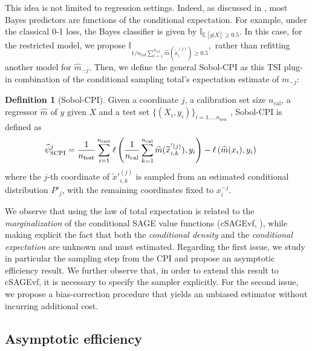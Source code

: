 \documentclass{article}
\theoremstyle{plain}
\theoremstyle{definition}
\newtheorem{definition}[theorem]{Definition}
\theoremstyle{remark}
\begin{document}
This idea is not limited to regression settings. Indeed, as discussed in \citet{williamson2023general}, most Bayes predictors are functions of the conditional expectation. 
%
For example, under the classical 0-1 loss, the Bayes classifier is given by $\mathbb{I}_{\mathbb{E}[y|X] \geq 0.5}$. 
%
In this case, for the restricted model, we propose
$
\mathbb{I}_{1/n_\mathrm{cal} \sum_{i=1}^{n_\mathrm{cal}} \widehat{m}\left( \widetilde{x}^{(j)}_i \right) \geq 0.5},
$
rather than refitting another model for $\widehat{m}_{-j}$.
%
Then, we define the general Sobol-CPI as this TSI plug-in combination of the conditional sampling total's expectation estimate of $m_{-j}$:
%
\begin{definition}[Sobol-CPI] Given a coordinate $j$, a calibration set size $n_\mathrm{cal}$, a regressor $\widehat{m}$ of $y$ given $X$ and a test set $\{(X_i, y_i)\}_{i=1,\ldots n_\mathrm{test}}$ , Sobol-CPI is defined as
\begin{align*}
\hspace*{-2mm}
    \widehat{\psi}_{\mathrm{SCPI}}^j&=\frac{1}{n_{\mathrm{test}}}\sum_{i=1}^{n_{\mathrm{test}}}\ell\left(\frac{1}{n_\mathrm{cal}}\sum_{k=1}^{n_\mathrm{cal}}\widehat{m}(\widetilde{x}^{'(j)}_{i,k}),y_i\right)-\ell\left(\widehat{m}(x_i), y_i\right)
\end{align*}
where the $j$-th coordinate of $\widetilde{x}'^{(j)}_{i,k}$ is sampled from an estimated conditional distribution $P'_j$, with the remaining coordinates fixed to $x_i^{-j}$.
\end{definition}
We observe that using the law of total expectation is related to the \textit{marginalization} of the conditional SAGE value functions (cSAGEvf, \citet{covert2020}), while making explicit the fact that both the \textit{conditional density} and the \textit{conditional expectation} are unknown and must estimated. Regarding the first issue, we study in particular the sampling step from the CPI and propose an asymptotic efficiency result. We further observe that, in order to extend this result to cSAGEvf, it is necessary to specify the sampler explicitly. For the second issue, we propose a bias-correction procedure that yields an unbiased estimator without incurring additional cost.


\subsection{Asymptotic efficiency}\label{subsec:asymp_eff}
%
%
\end{document}
